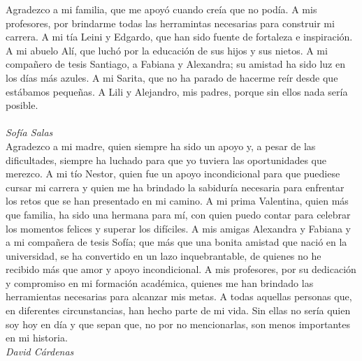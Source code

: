 \documentclass[spanish]{ieee_upb}
\begin{document}
Agradezco a mi familia, que me apoyó cuando creía
que no podía. A mis profesores, por brindarme todas las herramintas necesarias para construir mi carrera.
 A mi tía Leini y Edgardo, que han sido fuente de 
fortaleza e inspiración. A mi abuelo Alí, que luchó por la educación
de sus hijos y sus nietos. 
A mi compañero de tesis 
Santiago, a Fabiana y Alexandra; su amistad 
ha sido luz en los días más azules. 
A mi Sarita, que no ha parado de hacerme reír 
desde que estábamos pequeñas. 
A Lili y Alejandro, mis padres, 
porque sin ellos nada sería posible. 
\\
\\
\textit{Sofía Salas}
\\
\indent Agradezco a mi madre, quien siempre ha sido un apoyo y, a pesar de 
las dificultades, siempre ha luchado para que yo tuviera las oportunidades que merezco.
A mi tío Nestor, quien fue un apoyo incondicional para que puediese cursar mi carrera y quien me ha brindado la sabiduría 
necesaria para enfrentar los retos que se han presentado en mi camino.
A mi prima Valentina, quien más que familia, ha sido una hermana para mí, con quien puedo contar para celebrar 
los momentos felices y superar los difíciles.
A mis amigas Alexandra y Fabiana y a mi compañera de tesis Sofía; que más que una bonita amistad que nació en la universidad, 
se ha convertido en un lazo inquebrantable, de quienes no he recibido más que amor y apoyo incondicional.
A mis profesores, por su dedicación y compromiso en mi formación académica, quienes me han brindado las herramientas necesarias para alcanzar mis metas.
A todas aquellas personas que, en diferentes circunstancias, han hecho parte de mi vida. Sin ellas no sería quien soy hoy en día
y que sepan que, no por no mencionarlas, son menos importantes en mi historia.
\\
\textit{David Cárdenas}


\clearpage
\renewcommand\contentsname{\hfill\normalfont\bfseries CONTENIDO\hfill}
\tableofcontents

\renewcommand{\thetable}{\Roman{table}}


\makeatletter
\renewcommand{\numberline}[1]{%
  \stepcounter{tabindexcounter}%
  Tabla~\arabic{tabindexcounter}~%
}
\makeatother

\end{document}
